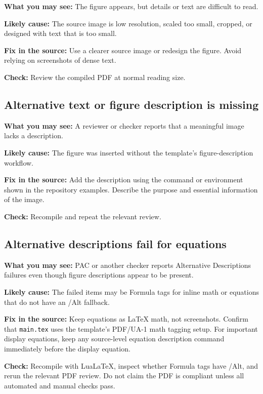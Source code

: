 \textbf{What you may see:} The figure appears, but details or text are difficult to read.

\textbf{Likely cause:} The source image is low resolution, scaled too small, cropped, or designed with text that is too small.

\textbf{Fix in the source:} Use a clearer source image or redesign the figure. Avoid relying on screenshots of dense text.

\textbf{Check:} Review the compiled PDF at normal reading size.

\subsection{Alternative text or figure description is missing}
\label{subsec:figure-description-missing}

\textbf{What you may see:} A reviewer or checker reports that a meaningful image lacks a description.

\textbf{Likely cause:} The figure was inserted without the template's figure-description workflow.

\textbf{Fix in the source:} Add the description using the command or environment shown in the repository examples. Describe the purpose and essential information of the image.

\textbf{Check:} Recompile and repeat the relevant review.

\subsection{Alternative descriptions fail for equations}
\label{subsec:formula-alternative-descriptions-fail}

\textbf{What you may see:} PAC or another checker reports Alternative Descriptions failures even though figure descriptions appear to be present.

\textbf{Likely cause:} The failed items may be Formula tags for inline math or equations that do not have an /Alt fallback.

\textbf{Fix in the source:} Keep equations as \LaTeX{} math, not screenshots. Confirm that \texttt{main.tex} uses the template's PDF/UA-1 math tagging setup. For important display equations, keep any source-level equation description command immediately before the display equation.

\textbf{Check:} Recompile with LuaLaTeX, inspect whether Formula tags have /Alt, and rerun the relevant PDF review. Do not claim the PDF is compliant unless all automated and manual checks pass.

